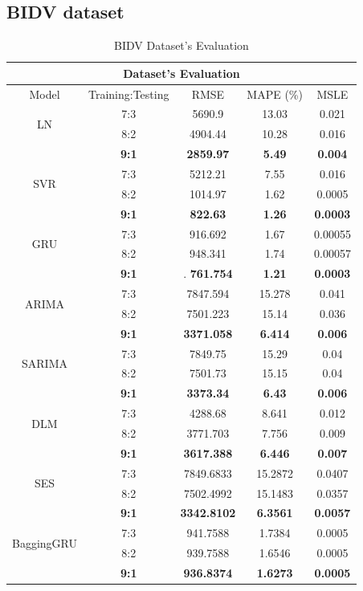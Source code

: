 \documentclass{ieeeojies}
\begin{document}
\subsection{BIDV dataset} 
\begin{table}[H]
    \centering
    \begin{tabular}{|c|c|c|c|c|}
         \hline
         \multicolumn{5}{|c|}{\textbf{Dataset's Evaluation}}\\
         \hline
         \centering Model & Training:Testing & RMSE & MAPE (\%) & MSLE\\
         \hline
         \multirow{2}{*}{LN} & 7:3 & 5690.9 & 13.03 & 0.021 \\ & 8:2 & 4904.44 & 10.28 & 0.016 \\ & \textbf{9:1} & \textbf{2859.97} & \textbf{5.49} & \textbf{0.004} \\
         \hline
         \multirow{2}{*}{SVR} & 7:3 & 5212.21 & 7.55 & 0.016 \\ & 8:2 & 1014.97 & 1.62 & 0.0005 \\ & \textbf{9:1} & \textbf{822.63} & \textbf{1.26} & \textbf{0.0003}\\
         \hline
         \multirow{2}{*}{GRU} & 7:3 & 916.692 & 1.67 & 0.00055 \\ &  8:2 & 948.341 & 1.74 & 0.00057 \\ & \textbf{9:1} &. \textbf{761.754} & \textbf{1.21} & \textbf{0.0003}\\
         \hline
         \multirow{2}{*}{ARIMA} & 7:3 & 7847.594 & 15.278 & 0.041 \\ & 8:2 & 7501.223 & 15.14 & 0.036 \\ & \textbf{9:1} & \textbf{3371.058} & \textbf{6.414} & \textbf{0.006}\\
         \hline
         \multirow{2}{*}{SARIMA} & 7:3 & 7849.75 & 15.29 & 0.04 \\ &8:2 &7501.73 & 15.15 & 0.04 \\ &  \textbf{9:1} & \textbf{3373.34} & \textbf{6.43} & \textbf{0.006}\\
         \hline
         \multirow{2}{*}{DLM} & 7:3 & 4288.68 & 8.641 & 0.012\\ & 8:2 & 3771.703	& 7.756 & 0.009\\ & \textbf{9:1} & \textbf{3617.388} & \textbf{6.446} & \textbf{0.007}\\
         \hline
         \multirow{2}{*}{SES} & 7:3 &  7849.6833 & 15.2872 & 0.0407 \\ & 8:2 & 7502.4992 & 15.1483 & 0.0357 \\ & \textbf{9:1} &  \textbf{3342.8102} &	\textbf{6.3561} & 	\textbf{0.0057} \\
         \hline
         \multirow{2}{*}{BaggingGRU} & 7:3 & 941.7588 &  1.7384 &  0.0005 \\ & 8:2 & 939.7588 &  1.6546 &  0.0005 \\ & \textbf{9:1} & \textbf{936.8374} & \textbf{1.6273} & \textbf{0.0005}\\
         \hline
    \end{tabular}
    \caption{BIDV Dataset's Evaluation}
    \label{mbbresult}
\end{table}
\end{document}
